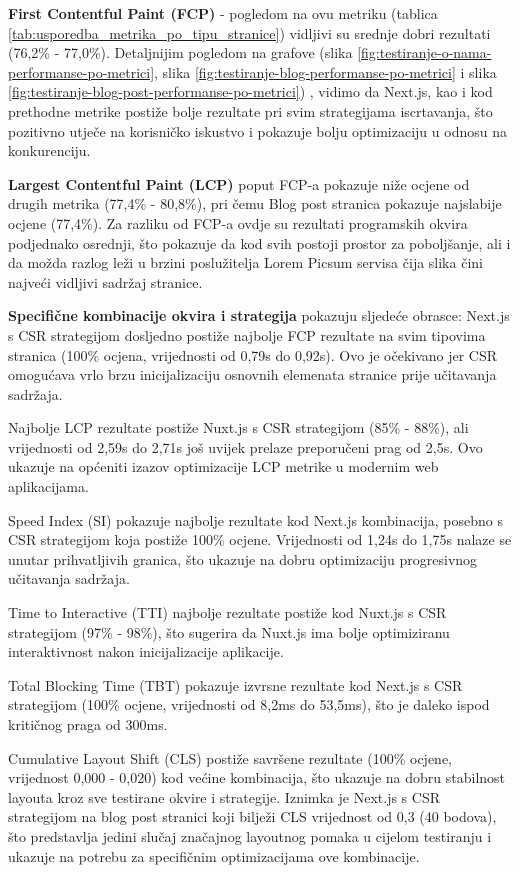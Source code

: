 \textbf{First Contentful Paint (FCP)} - pogledom na ovu metriku (tablica \ref{tab:usporedba_metrika_po_tipu_stranice}) vidljivi su srednje dobri rezultati (76,2\% - 77,0\%). Detaljnijim pogledom na grafove (slika  \ref{fig:testiranje-o-nama-performanse-po-metrici}, slika \ref{fig:testiranje-blog-performanse-po-metrici} i slika \ref{fig:testiranje-blog-post-performanse-po-metrici}) , vidimo da Next.js, kao i kod prethodne metrike postiže bolje rezultate pri svim strategijama iscrtavanja, što pozitivno utječe na korisničko iskustvo i pokazuje bolju optimizaciju u odnosu na konkurenciju.

\textbf{Largest Contentful Paint (LCP)} poput FCP-a pokazuje niže ocjene od drugih metrika (77,4\% - 80,8\%), pri čemu Blog post stranica pokazuje najslabije ocjene (77,4\%). Za razliku od FCP-a ovdje su rezultati programskih okvira podjednako osrednji, što pokazuje da kod svih postoji prostor za poboljšanje, ali i da možda razlog leži u brzini poslužitelja Lorem Picsum servisa čija slika čini najveći vidljivi sadržaj stranice.

\textbf{Specifične kombinacije okvira i strategija} pokazuju sljedeće obrasce: Next.js s CSR strategijom dosljedno postiže najbolje FCP rezultate na svim tipovima stranica (100\% ocjena, vrijednosti od 0,79s do 0,92s). Ovo je očekivano jer CSR omogućava vrlo brzu inicijalizaciju osnovnih elemenata stranice prije učitavanja sadržaja.

Najbolje LCP rezultate postiže Nuxt.js s CSR strategijom (85\% - 88\%), ali vrijednosti od 2,59s do 2,71s još uvijek prelaze preporučeni prag od 2,5s. Ovo ukazuje na općeniti izazov optimizacije LCP metrike u modernim web aplikacijama.

Speed Index (SI) pokazuje najbolje rezultate kod Next.js kombinacija, posebno s CSR strategijom koja postiže 100\% ocjene. Vrijednosti od 1,24s do 1,75s nalaze se unutar prihvatljivih granica, što ukazuje na dobru optimizaciju progresivnog učitavanja sadržaja.

Time to Interactive (TTI) najbolje rezultate postiže kod Nuxt.js s CSR strategijom (97\% - 98\%), što sugerira da Nuxt.js ima bolje optimiziranu interaktivnost nakon inicijalizacije aplikacije.

Total Blocking Time (TBT) pokazuje izvrsne rezultate kod Next.js s CSR strategijom (100\% ocjene, vrijednosti od 8,2ms do 53,5ms), što je daleko ispod kritičnog praga od 300ms.

Cumulative Layout Shift (CLS) postiže savršene rezultate (100\% ocjene, vrijednost 0,000 - 0,020) kod većine kombinacija, što ukazuje na dobru stabilnost layouta kroz sve testirane okvire i strategije. Iznimka je Next.js s CSR strategijom na blog post stranici koji bilježi CLS vrijednost od 0,3 (40 bodova), što predstavlja jedini slučaj značajnog layoutnog pomaka u cijelom testiranju i ukazuje na potrebu za specifičnim optimizacijama ove kombinacije.

